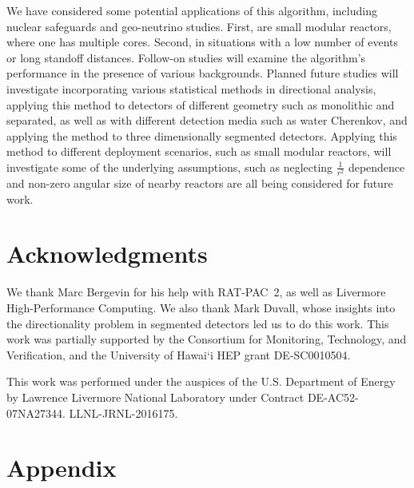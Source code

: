 \documentclass[tightenlines,twocolumn,prl,notitlepage,nofootinbib,preprintnumbers,longbibliography]{revtex4-1}
\begin{document}
We have considered some potential applications of this algorithm, including nuclear safeguards and geo-neutrino studies. First, are small modular reactors, where one has multiple cores. Second, in situations with a low number of events or long standoff distances. Follow-on studies will examine the algorithm's performance in the presence of various backgrounds. Planned future studies will investigate incorporating various statistical methods in directional analysis, applying this method to detectors of different geometry such as monolithic and separated, as well as with different detection media such as water Cherenkov, and applying the method to three dimensionally segmented detectors. Applying this method to different deployment scenarios, such as small modular reactors, will investigate some of the underlying assumptions, such as neglecting \(\frac{1}{r^2}\) dependence and non-zero angular size of nearby reactors are all being considered for future work.

\section{Acknowledgments}
We thank Marc Bergevin for his help with RAT-PAC~2, as well as Livermore High-Performance Computing. We also thank Mark Duvall, whose insights into the directionality problem in segmented detectors led us to do this work.
This work was partially supported by the Consortium for Monitoring, Technology, and Verification, and the University of Hawai`i HEP grant DE-SC0010504.

This work was performed under the auspices of the U.S. Department of Energy by Lawrence Livermore National Laboratory under Contract DE-AC52-07NA27344. LLNL-JRNL-2016175.


\appendix*
\section{Appendix}
\end{document}
